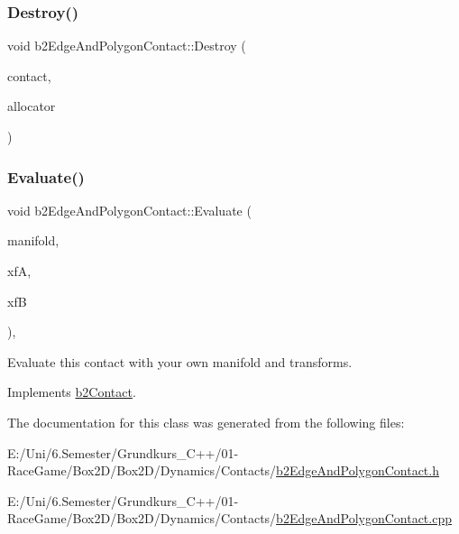 \mbox{\label{classb2_edge_and_polygon_contact_a83260c190706928518ab1a3040c0c515}} 
\subsubsection{\texorpdfstring{Destroy()}{Destroy()}}
{\footnotesize\ttfamily void b2\+Edge\+And\+Polygon\+Contact\+::\+Destroy (\begin{DoxyParamCaption}\item[{\mbox{\hyperlink{classb2_contact}{b2\+Contact}} $\ast$}]{contact,  }\item[{\mbox{\hyperlink{classb2_block_allocator}{b2\+Block\+Allocator}} $\ast$}]{allocator }\end{DoxyParamCaption})\hspace{0.3cm}{\ttfamily [static]}}

\mbox{\label{classb2_edge_and_polygon_contact_ae99fba8c1cb7e5d7c11ab78ca80e775d}} 
\subsubsection{\texorpdfstring{Evaluate()}{Evaluate()}}
{\footnotesize\ttfamily void b2\+Edge\+And\+Polygon\+Contact\+::\+Evaluate (\begin{DoxyParamCaption}\item[{\mbox{\hyperlink{structb2_manifold}{b2\+Manifold}} $\ast$}]{manifold,  }\item[{const \mbox{\hyperlink{structb2_transform}{b2\+Transform}} \&}]{xfA,  }\item[{const \mbox{\hyperlink{structb2_transform}{b2\+Transform}} \&}]{xfB }\end{DoxyParamCaption})\hspace{0.3cm}{\ttfamily [override]}, {\ttfamily [virtual]}}



Evaluate this contact with your own manifold and transforms. 



Implements \mbox{\hyperlink{classb2_contact_ae3c2842e5325b2d4500f8ed1d4de2f72}{b2\+Contact}}.



The documentation for this class was generated from the following files\+:\begin{DoxyCompactItemize}
\item 
E\+:/\+Uni/6.\+Semester/\+Grundkurs\+\_\+\+C++/01-\/\+Race\+Game/\+Box2\+D/\+Box2\+D/\+Dynamics/\+Contacts/\mbox{\hyperlink{b2_edge_and_polygon_contact_8h}{b2\+Edge\+And\+Polygon\+Contact.\+h}}\item 
E\+:/\+Uni/6.\+Semester/\+Grundkurs\+\_\+\+C++/01-\/\+Race\+Game/\+Box2\+D/\+Box2\+D/\+Dynamics/\+Contacts/\mbox{\hyperlink{b2_edge_and_polygon_contact_8cpp}{b2\+Edge\+And\+Polygon\+Contact.\+cpp}}\end{DoxyCompactItemize}
